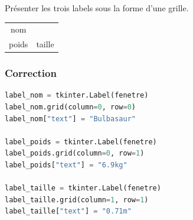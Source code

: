 \documentclass[svgnames,11pt]{beamer}
\begin{document}
\begin{frame}
    \frametitle{}
    \begin{activite}
        Présenter les trois labels sous la forme d'une grille.
        \begin{center}
            \begin{tabular}{cc}
                nom   &        \\
                poids & taille \\
            \end{tabular}
        \end{center}
    \end{activite}


\end{frame}

\begin{frame}[fragile]
    \frametitle{Correction}

    \begin{center}
        \begin{lstlisting}[language=Python , basicstyle=\ttfamily\small, xleftmargin=1em, xrightmargin=1em]
label_nom = tkinter.Label(fenetre)
label_nom.grid(column=0, row=0)
label_nom["text"] = "Bulbasaur"

label_poids = tkinter.Label(fenetre)
label_poids.grid(column=0, row=1)
label_poids["text"] = "6.9kg"

label_taille = tkinter.Label(fenetre)
label_taille.grid(column=1, row=1)
label_taille["text"] = "0.71m"
\end{lstlisting}
        \label{CODE}
    \end{center}

\end{frame}
\end{document}
